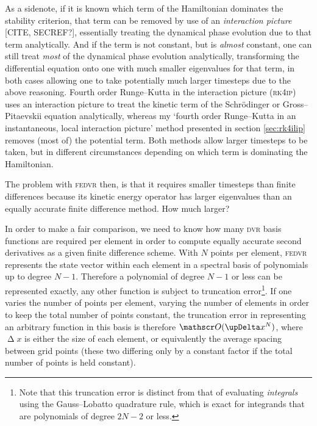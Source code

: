 As a sidenote, if it is known which term of the Hamiltonian dominates the stability criterion, that term can be removed by use of an \emph{interaction picture} [CITE, SECREF?], essentially treating the dynamical phase evolution due to that term analytically. And if the term is not constant, but is \emph{almost} constant, one can still treat \emph{most} of the dynamical phase evolution analytically, transforming the differential equation onto one with much smaller eigenvalues for that term, in both cases allowing one to take potentially much larger timesteps due to the above reasoning. Fourth order Runge--Kutta in the interaction picture (\textsc{rk4ip}) \cite{caradoc_davies_thesis} uses an interaction picture to treat the kinetic term of the Schr\"odinger or Gross--Pitaevskii equation analytically, whereas my `fourth order Runge--Kutta in an instantaneous, local interaction picture' method presented in section \ref{sec:rk4ilip} removes (most of) the potential term. Both methods allow larger timesteps to be taken, but in different circumstances depending on which term is dominating the Hamiltonian.

The problem with \textsc{fedvr} then, is that it requires smaller timesteps than finite differences because its kinetic energy operator has larger eigenvalues than an equally accurate finite difference method. How much larger?

In order to make a fair comparison, we need to know how many \textsc{dvr} basis functions are required per element in order to compute equally accurate second derivatives as a given finite difference scheme. With $N$ points per element, \textsc{fedvr} represents the state vector within each element in a spectral basis of polynomials up to degree $N - 1$. Therefore a polynomial of degree $N - 1$ or less can be represented exactly, any other function is subject to truncation error\footnote{Note that this truncation error is distinct from that of evaluating \emph{integrals} using the Gauss--Lobatto quadrature rule, which is exact for integrands that are polynomials of degree $2N - 2$ or less.}. If one varies the number of points per element, varying the number of elements in order to keep the total number of points constant, the truncation error in representing an arbitrary function in this basis is therefore $\Ord{\upDelta x^N}$, where $\upDelta x$ is either the size of each element, or equivalently the average spacing between grid points (these two differing only by a constant factor if the total number of points is held constant).

